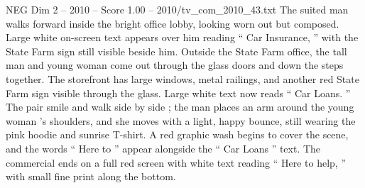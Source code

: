 \begin{textsample}{NEG Dim 2 – 2010 – Score 1.00 – 2010/tv\_com\_2010\_43.txt}
The suited man walks forward inside the bright office lobby, looking worn out but composed.
Large white on-screen text appears over him reading “ Car Insurance, ” with the State Farm sign still visible beside him.
Outside the State Farm office, the tall man and young woman come out through the glass doors and down the steps together.
The storefront has large windows, metal railings, and another red State Farm sign visible through the glass.
Large white text now reads “ Car Loans. ” The pair smile and walk side by side ; the man places an arm around the young woman ’s shoulders, and she moves with a light, happy bounce, still wearing the pink hoodie and sunrise T-shirt.
A red graphic wash begins to cover the scene, and the words “ Here to ” appear alongside the “ Car Loans ” text.
The commercial ends on a full red screen with white text reading “ Here to help, ” with small fine print along the bottom.

\end{textsample}

